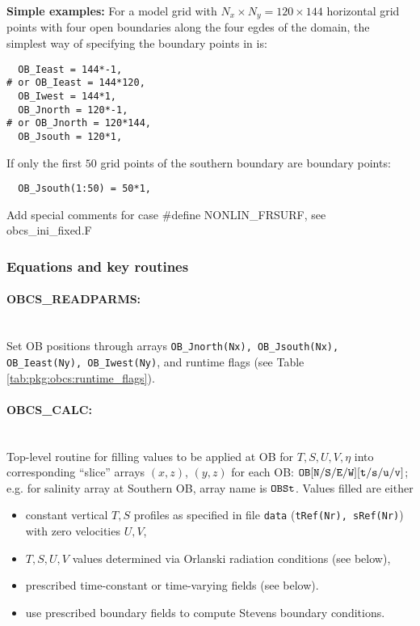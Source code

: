 \noindent\textbf{Simple examples:} For a model grid with $ N_{x}\times
N_{y} = 120\times144$ horizontal grid points with four open boundaries
along the four egdes of the domain, the simplest way of specifying the
boundary points in  is:
\begin{verbatim}
  OB_Ieast = 144*-1,
# or OB_Ieast = 144*120,
  OB_Iwest = 144*1,
  OB_Jnorth = 120*-1,
# or OB_Jnorth = 120*144,
  OB_Jsouth = 120*1,
\end{verbatim}
If only the first $50$ grid points of the southern boundary are
boundary points: 
\begin{verbatim}
  OB_Jsouth(1:50) = 50*1,
\end{verbatim}

\noindent
\textsf{Add special comments for case \#define NONLIN\_FRSURF,
see obcs\_ini\_fixed.F}


\subsubsection{Equations and key routines
\label{sec:pkg:obcs:equations}}

\paragraph{OBCS\_READPARMS:} ~ \\
Set OB positions through arrays
{\tt OB\_Jnorth(Nx), OB\_Jsouth(Nx), OB\_Ieast(Ny), OB\_Iwest(Ny)},
and runtime flags (see Table \ref{tab:pkg:obcs:runtime_flags}).

\paragraph{OBCS\_CALC:} ~ \\
%
Top-level routine for filling values to be applied at OB for 
$T,S,U,V,\eta$ into corresponding 
``slice'' arrays $(x,z)$, $(y,z)$ for each OB:
$\tt OB[N/S/E/W][t/s/u/v]$; e.g. for salinity array at
Southern OB, array name is $\tt OBSt$.
Values filled are either
%
\begin{itemize}
%
\item
constant vertical $T,S$ profiles as specified in file
{\tt data} ({\tt tRef(Nr), sRef(Nr)}) with zero velocities $U,V$,
%
\item
$T,S,U,V$ values determined via Orlanski radiation conditions
(see below),
%
\item
prescribed time-constant or time-varying fields (see below).
%
\item 
use prescribed boundary fields to compute Stevens boundary conditions.
\end{itemize}

